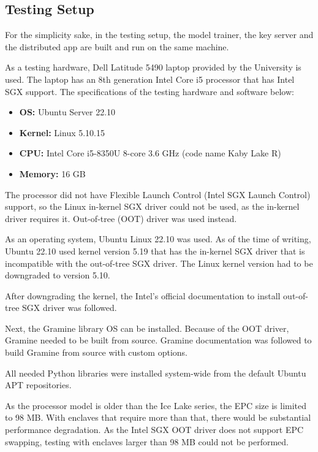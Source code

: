 \subsection{Testing Setup} \label{setup}

For the simplicity sake, in the testing setup, the model trainer, the key server and the distributed app are built and run on the same machine.

As a testing hardware, Dell Latitude 5490 laptop provided by the University is used. The laptop has an 8th generation Intel Core i5 processor that has Intel SGX support. The specifications of the testing hardware and software below:

\begin{itemize}
  \item \textbf{OS:} Ubuntu Server 22.10 
  \item \textbf{Kernel:} Linux 5.10.15
  \item \textbf{CPU:} Intel Core i5-8350U 8-core 3.6 GHz (code name Kaby Lake R)
  \item \textbf{Memory:} 16 GB
\end{itemize}

The processor did not have Flexible Launch Control (Intel SGX Launch Control) support, so the Linux in-kernel SGX driver could not be used, as the in-kernel driver requires it. Out-of-tree (OOT) driver was used instead.

As an operating system, Ubuntu Linux 22.10 was used. As of the time of writing, Ubuntu 22.10 used kernel version 5.19 that has the in-kernel SGX driver that is incompatible with the out-of-tree SGX driver. The Linux kernel version had to be downgraded to version 5.10.

After downgrading the kernel, the Intel's official documentation\cite{sgxinstall} to install out-of-tree SGX driver was followed.

Next, the Gramine library OS can be installed. Because of the OOT driver, Gramine needed to be built from source. Gramine documentation\cite{graminedocs} was followed to build Gramine from source with custom options.

All needed Python libraries were installed system-wide from the default Ubuntu APT repositories.

As the processor model is older than the Ice Lake series, the EPC size is limited to 98 MB. With enclaves that require more than that, there would be substantial performance degradation. As the Intel SGX OOT driver does not support EPC swapping, testing with enclaves larger than 98 MB could not be performed.


